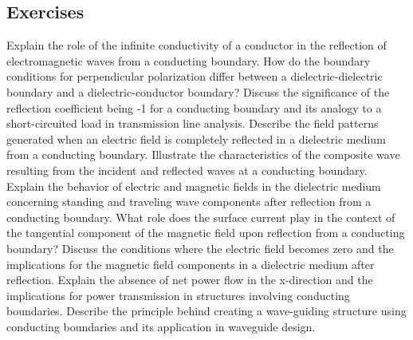 \begin{mdframed}[ backgroundcolor=lightblue, linewidth=1pt, hidealllines=true]
\section*{Exercises}
\begin{ExerciseList}
\Exercise[label={ex341}]
Explain the role of the infinite conductivity of a conductor in the reflection of electromagnetic waves from a conducting boundary.
\Exercise[label={ex342}]
How do the boundary conditions for perpendicular polarization differ between a dielectric-dielectric boundary and a dielectric-conductor boundary?
\Exercise[label={ex343}]
Discuss the significance of the reflection coefficient being -1 for a conducting boundary and its analogy to a short-circuited load in transmission line analysis.
\Exercise[label={ex344}]
Describe the field patterns generated when an electric field is completely reflected in a dielectric medium from a conducting boundary.
\Exercise[label={ex345}]
Illustrate the characteristics of the composite wave resulting from the incident and reflected waves at a conducting boundary.
\Exercise[label={ex346}]
Explain the behavior of electric and magnetic fields in the dielectric medium concerning standing and traveling wave components after reflection from a conducting boundary.
\Exercise[label={ex347}]
What role does the surface current play in the context of the tangential component of the magnetic field upon reflection from a conducting boundary?
\Exercise[label={ex348}]
Discuss the conditions where the electric field becomes zero and the implications for the magnetic field components in a dielectric medium after reflection.
\Exercise[label={ex349}]
Explain the absence of net power flow in the x-direction and the implications for power transmission in structures involving conducting boundaries.
\Exercise[label={ex3410}]
Describe the principle behind creating a wave-guiding structure using conducting boundaries and its application in waveguide design.
\end{ExerciseList}
\end{mdframed}
